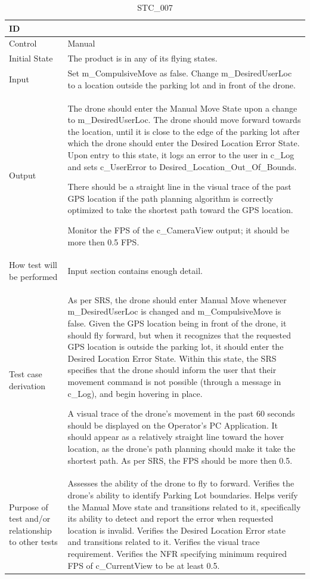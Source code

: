 \documentclass[12pt, titlepage]{article}
\begin{document}
\begin{table}[!h]
\begin{center}
\caption {STC\_007}
\label{tab:STC_007}
\begin{tabular}{ | m{3.2cm} | m{12.2cm} | } 
\hline
ID & \nameref{tab:STC_007} \\ 
\hline
Control & Manual \\ 
\hline
Initial State & The product is in any of its flying states.   \\ 
\hline
Input & Set m\_CompulsiveMove as false. Change m\_DesiredUserLoc to a location outside the parking lot and in front of the drone.  \\ 
\hline
Output & The drone should enter the Manual Move State upon a change to m\_DesiredUserLoc. The drone should move forward towards the location, until it is close to the edge of the parking lot after which the drone should enter the Desired Location Error State. Upon entry to this state, it logs an error to the user in c\_Log and sets c\_UserError to Desired\_Location\_Out\_Of\_Bounds. 

There should be a straight line in the visual trace of the past GPS location if the path planning algorithm is correctly optimized to take the shortest path toward the GPS location. 

Monitor the FPS of the c\_CameraView output; it should be more then 0.5 FPS.  \\ 
\hline
How test will be performed & Input section contains enough detail. \\ 
\hline
Test case derivation & As per SRS, the drone should enter Manual Move whenever m\_DesiredUserLoc is changed and m\_CompulsiveMove is false. Given the GPS location being in front of the drone, it should fly forward, but when it recognizes that the requested GPS location is outside the parking lot, it should enter the Desired Location Error State. Within this state, the SRS specifies that the drone should inform the user that their movement command is not possible (through a message in c\_Log), and begin hovering in place.

A visual trace of the drone's movement in the past 60 seconds should be displayed on the Operator's PC Application. It should appear as a relatively straight line toward the hover location, as the drone's path planning should make it take the shortest path. 
As per SRS, the FPS should be more then 0.5.
 \\ 
\hline
Purpose of test and/or relationship to other tests & 
Assesses the ability of the drone to fly to forward.
Verifies the drone’s ability to identify Parking Lot boundaries.
Helps verify the Manual Move state and transitions related to it, specifically its ability to detect and report the error when requested location is invalid. 
Verifies the Desired Location Error state and transitions related to it. 
Verifies the visual trace requirement. 
Verifies the NFR specifying minimum required FPS of c\_CurrentView to be at least 0.5.
\\ 
\hline
\end{tabular}
\end{center}
\end{table}
\end{document}

